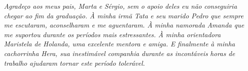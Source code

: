 \emph{Agradeço aos meus pais, Marta e Sérgio, sem o apoio deles eu não conseguiria chegar ao fim da graduação. À minha irmã Tata e seu marido Pedro que sempre
me escutaram, aconselharam e me aguentaram. À minha namorada Amanda que me suportou durante os períodos mais estressantes.
À minha orientadora \prof[a] \dr[a] Maristela de Holanda, uma excelente mentora e amiga. E finalmente à minha cachorrinha Hera,
sua inestimável companhia durante as incontáveis horas de trabalho ajudaram tornar este período tolerável.}
